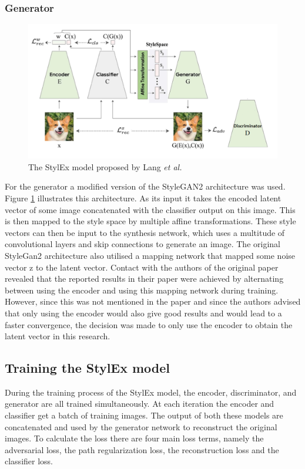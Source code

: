 \subsubsection{Generator}
\begin{figure}
     \centering
     \includegraphics[scale=0.2]{images/Model_edit.png}
     \caption{The StylEx model proposed by Lang \textit{et al.} \cite{explaining_in_style}}
     \label{fig:Model_edit}
\end{figure}
For the generator a modified version of the StyleGAN2 architecture was used. Figure \ref{fig:Model_edit} illustrates this architecture. As its input it takes the encoded latent vector of some image concatenated with the classifier output on this image. This is then mapped to the style space by multiple affine transformations. These style vectors can then be input to the synthesis network, which uses a multitude of convolutional layers and skip connections to generate an image. The original StyleGan2 architecture also utilised a mapping network that mapped some noise vector z to the latent vector. Contact with the authors of the original paper revealed that the reported results in their paper were achieved by alternating between using the encoder and using this mapping network during training. However, since this was not mentioned in the paper and since the authors advised that only using the encoder would also give good results and would lead to a faster convergence, the decision was made to only use the encoder to obtain the latent vector in this research.

\subsection{Training the StylEx model}
During the training process of the StylEx model, the encoder, discriminator, and generator are all trained simultaneously. At each iteration the encoder and classifier get a batch of training images. The output of both these models are concatenated and used by the generator network to reconstruct the original images. To calculate the loss there are four main loss terms, namely the adversarial loss, the path regularization loss, the reconstruction loss and the classifier loss.

